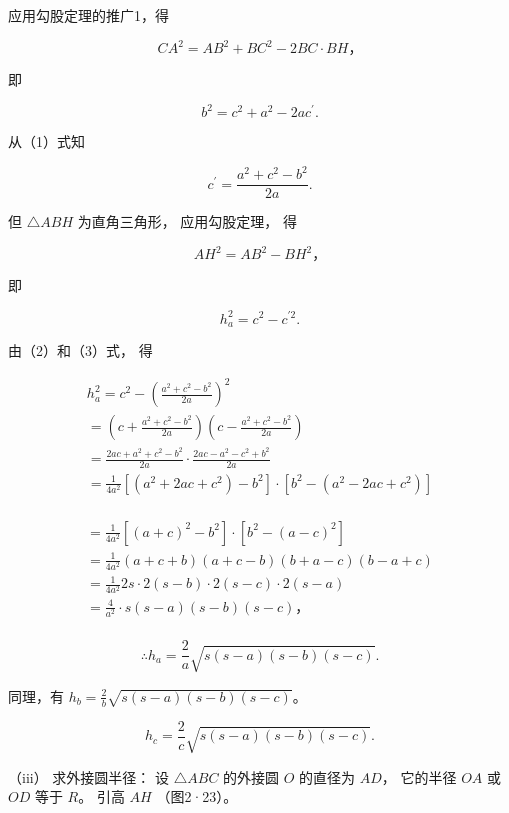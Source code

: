 应用勾股定理的推广1，得

\[
C A ^ {2} = A B ^ {2} + B C ^ {2} - 2 B C \cdot B H\text{，}
\]

即

\[
b ^ {2} = c ^ {2} + a ^ {2} - 2 a c ^ {\prime}. \tag {1}
\]

从（1）式知

\[
c ^ {\prime} = \frac {a ^ {2} + c ^ {2} - b ^ {2}}{2 a}. \tag {2}
\]

但 \(\triangle ABH\) 为直角三角形， 应用勾股定理， 得

\[
A H ^ {2} = A B ^ {2} - B H ^ {2}\text{，}
\]

即

\[
h _ {a} ^ {2} = c ^ {2} - c ^ {\prime 2}. \tag {3}
\]

由（2）和（3）式， 得

\[
\begin{array}{l} h _ {a} ^ {2} = c ^ {2} - \left(\frac {a ^ {2} + c ^ {2} - b ^ {2}}{2 a}\right) ^ {2} \\ = \left(c + \frac {a ^ {2} + c ^ {2} - b ^ {2}}{2 a}\right) \left(c - \frac {a ^ {2} + c ^ {2} - b ^ {2}}{2 a}\right) \\ = \frac {2ac + a^2 + c^2 - b^2}{2 a} \cdot \frac {2 a c - a ^ {2} - c ^ {2} + b ^ {2}}{2 a} \\ = \frac {1}{4 a ^ {2}} \left[ (a ^ {2} + 2 a c + c ^ {2}) - b ^ {2} \right] \cdot \left[ b ^ {2} - (a ^ {2} - 2 a c + c ^ {2}) \right] \\ \end{array}
\]

\[
\begin{array}{l} = \frac {1}{4 a ^ {2}} \left[ (a + c) ^ {2} - b ^ {2} \right] \cdot \left[ b ^ {2} - (a - c) ^ {2} \right] \\ = \frac {1}{4 a ^ {2}} (a + c + b) (a + c - b) (b + a - c) (b - a + c) \\ = \frac {1}{4 a ^ {2}} 2 s \cdot 2 (s - b) \cdot 2 (s - c) \cdot 2 (s - a) \\ = \frac {4}{a ^ {2}} \cdot s (s - a) (s - b) (s - c)\text{，} \\ \end{array}
\]

\[
\therefore h _ {a} = \frac {2}{a} \sqrt {s (s - a) (s - b) (s - c)}.
\]

同理，有 \(h_b = \frac{2}{b}\sqrt{s(s-a)(s-b)(s-c)}\)。

\[
h _ {c} = \frac {2}{c} \sqrt {s (s - a) (s - b) (s - c)}.
\]

（iii） 求外接圆半径： 设 \(\triangle ABC\) 的外接圆 \(O\) 的直径为
\(AD\)， 它的半径 \(OA\) 或 \(OD\) 等于 \(R\)。 引高 \(AH\) （图2·23）。


